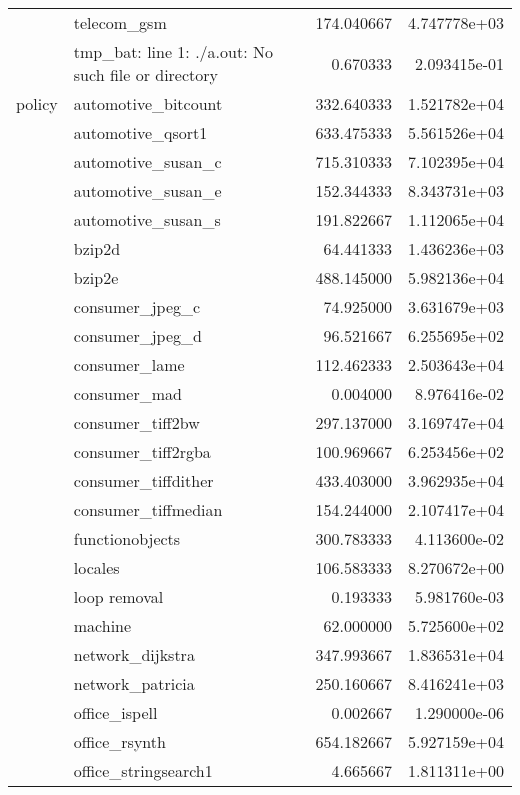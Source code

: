 \begin{table*}
\begin{center}
\begin{tabular}{llrr}
       & telecom\_gsm &    174.040667 &  4.747778e+03 \\
       & tmp\_bat: line 1: ./a.out: No such file or directory &      0.670333 &  2.093415e-01 \\
policy & automotive\_bitcount &    332.640333 &  1.521782e+04 \\
       & automotive\_qsort1 &    633.475333 &  5.561526e+04 \\
       & automotive\_susan\_c &    715.310333 &  7.102395e+04 \\
       & automotive\_susan\_e &    152.344333 &  8.343731e+03 \\
       & automotive\_susan\_s &    191.822667 &  1.112065e+04 \\
       & bzip2d &     64.441333 &  1.436236e+03 \\
       & bzip2e &    488.145000 &  5.982136e+04 \\
       & consumer\_jpeg\_c &     74.925000 &  3.631679e+03 \\
       & consumer\_jpeg\_d &     96.521667 &  6.255695e+02 \\
       & consumer\_lame &    112.462333 &  2.503643e+04 \\
       & consumer\_mad &      0.004000 &  8.976416e-02 \\
       & consumer\_tiff2bw &    297.137000 &  3.169747e+04 \\
       & consumer\_tiff2rgba &    100.969667 &  6.253456e+02 \\
       & consumer\_tiffdither &    433.403000 &  3.962935e+04 \\
       & consumer\_tiffmedian &    154.244000 &  2.107417e+04 \\
       & functionobjects &    300.783333 &  4.113600e-02 \\
       & locales &    106.583333 &  8.270672e+00 \\
       & loop removal &      0.193333 &  5.981760e-03 \\
       & machine &     62.000000 &  5.725600e+02 \\
       & network\_dijkstra &    347.993667 &  1.836531e+04 \\
       & network\_patricia &    250.160667 &  8.416241e+03 \\
       & office\_ispell &      0.002667 &  1.290000e-06 \\
       & office\_rsynth &    654.182667 &  5.927159e+04 \\
       & office\_stringsearch1 &      4.665667 &  1.811311e+00 \\

\end{tabular}
\end{center}
\end{table*}
